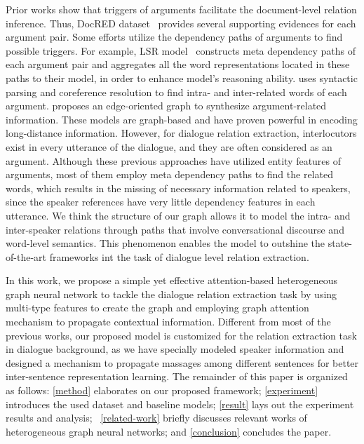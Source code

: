 \documentclass[letterpaper]{article} \usepackage{aaai21}  \usepackage{times}  \usepackage{helvet} \usepackage{courier}  \usepackage[hyphens]{url}  \usepackage{graphicx} \urlstyle{rm} \def\UrlFont{\rm}  \usepackage{natbib}  \usepackage{caption} \frenchspacing  \setlength{\pdfpagewidth}{8.5in}  \setlength{\pdfpageheight}{11in}
\begin{document}
Prior works show that triggers of arguments facilitate the document-level relation inference. Thus, DocRED dataset~\cite{yao2019docred} provides several supporting evidences for each argument pair. Some efforts utilize the dependency paths of arguments to find possible triggers. For example, LSR model~\cite{nan2020reasoning} constructs meta dependency paths of each argument pair and aggregates all the word representations located in these paths to their model, in order to enhance model's reasoning ability.
\citet{sahu2019inter} uses syntactic parsing and coreference resolution to find intra- and inter-related words of each argument. \citet{christopoulou2019connecting} proposes an edge-oriented graph to synthesize argument-related information.
These models are graph-based and have proven powerful in encoding long-distance information. However, for dialogue relation extraction, interlocutors exist in every utterance of the dialogue, and they are often considered as an argument. Although these previous approaches have utilized entity features of arguments, most of them employ meta dependency paths to find the related words, which results in the missing of necessary information related to speakers, since the speaker references have very little dependency features in each utterance. We think the structure of our graph allows it to model the intra- and inter-speaker relations through paths that involve conversational discourse and word-level semantics. This phenomenon enables the model to outshine the state-of-the-art frameworks int the task of dialogue level relation extraction. 

In this work, we propose a simple yet effective attention-based heterogeneous graph neural network to tackle the dialogue relation extraction task by using multi-type features to create the graph and employing graph attention mechanism to propagate contextual information. Different from most of the previous works, our proposed model is customized for the relation extraction task in dialogue background, as we have specially modeled speaker information and designed a mechanism to propagate massages among different sentences for better inter-sentence representation learning. The remainder of this paper is organized as follows: \cref{method} elaborates on our proposed framework; \cref{experiment} introduces the used dataset and baseline models; \cref{result} lays out the experiment results and analysis; ~\cref{related-work} briefly discusses relevant works of heterogeneous graph neural networks; and \cref{conclusion} concludes the paper.
\end{document}
